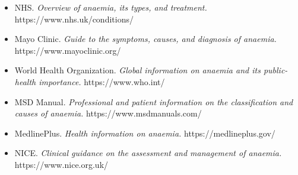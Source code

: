 \begin{itemize}
    \item NHS. \textit{Overview of anaemia, its types, and treatment.} https://www.nhs.uk/conditions/
    \item Mayo Clinic. \textit{Guide to the symptoms, causes, and diagnosis of anaemia.} https://www.mayoclinic.org/
    \item World Health Organization. \textit{Global information on anaemia and its public-health importance.} https://www.who.int/
    \item MSD Manual. \textit{Professional and patient information on the classification and causes of anaemia.} https://www.msdmanuals.com/
    \item MedlinePlus. \textit{Health information on anaemia.} https://medlineplus.gov/
    \item NICE. \textit{Clinical guidance on the assessment and management of anaemia.} https://www.nice.org.uk/
\end{itemize}
